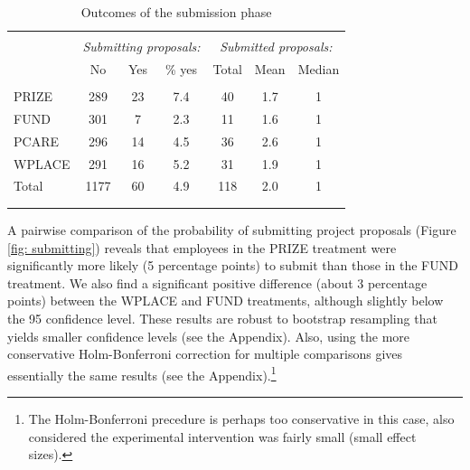 \documentclass[11pt, titlepage]{article}
\begin{document}
\begin{table}
\centering
\caption{Outcomes of the submission phase}
\label{tab: submissions}
\begin{tabular}{@{}lcccccc}
  \\[-1.8ex]\hline \hline \\[-1.8ex]
 & \multicolumn{3}{c}{\emph{Submitting proposals:}}& \multicolumn{3}{c}{\emph{Submitted proposals:}} \\
 \cmidrule(lr){2-4}\cmidrule(lr){5-7} & No & Yes & \% yes & Total & Mean & Median \\ 
  \hline \\[-1.86ex]
PRIZE & 289 & 23 & 7.4 & 40 & 1.7 & 1 \\ 
  FUND & 301 & 7 & 2.3 & 11 & 1.6 & 1 \\ 
  PCARE & 296 & 14 & 4.5 & 36 & 2.6 & 1 \\ 
  WPLACE & 291 & 16 & 5.2 & 31 & 1.9 & 1 \\ 
  [1.8ex] Total & 1177 & 60 & 4.9 & 118 & 2.0 & 1 \\ 
   \\[-1.8ex]\hline \hline \\[-1.8ex]
\end{tabular}
\end{table}

A pairwise comparison of the probability of submitting project proposals
(Figure \ref{fig: submitting}) reveals that employees in the PRIZE
treatment were significantly more likely (5 percentage points) to submit
than those in the FUND treatment. We also find a significant positive
difference (about 3 percentage points) between the WPLACE and FUND
treatments, although slightly below the 95 confidence level. These
results are robust to bootstrap resampling that yields smaller
confidence levels (see the Appendix). Also, using the more conservative
Holm-Bonferroni correction for multiple comparisons gives essentially
the same results (see the Appendix).\footnote{The Holm-Bonferroni
  precedure is perhaps too conservative in this case, also considered
  the experimental intervention was fairly small (small effect sizes).}
\end{document}
